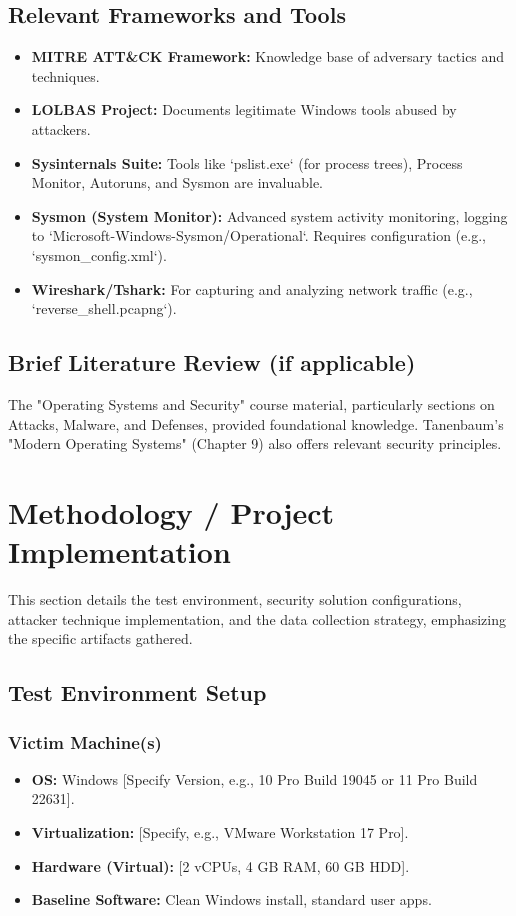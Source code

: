\documentclass[11pt]{article}
\begin{document}
	\subsection{Relevant Frameworks and Tools}
	\begin{itemize}
		\item \textbf{MITRE ATT\&CK Framework:} Knowledge base of adversary tactics and techniques.
		\item \textbf{LOLBAS Project:} Documents legitimate Windows tools abused by attackers.
		\item \textbf{Sysinternals Suite:} Tools like `pslist.exe` (for process trees), Process Monitor, Autoruns, and Sysmon are invaluable.
		\item \textbf{Sysmon (System Monitor):} Advanced system activity monitoring, logging to `Microsoft-Windows-Sysmon/Operational`. Requires configuration (e.g., `sysmon_config.xml`).
		\item \textbf{Wireshark/Tshark:} For capturing and analyzing network traffic (e.g., `reverse_shell.pcapng`).
	\end{itemize}
	\subsection{Brief Literature Review (if applicable)}
	The "Operating Systems and Security" course material, particularly sections on Attacks, Malware, and Defenses, provided foundational knowledge. Tanenbaum's "Modern Operating Systems" (Chapter 9) also offers relevant security principles.
	\newpage
	
	\section{Methodology / Project Implementation}
	This section details the test environment, security solution configurations, attacker technique implementation, and the data collection strategy, emphasizing the specific artifacts gathered.
	
	\subsection{Test Environment Setup}
	\subsubsection{Victim Machine(s)}
	\begin{itemize}
		\item \textbf{OS:} Windows [Specify Version, e.g., 10 Pro Build 19045 or 11 Pro Build 22631].
		\item \textbf{Virtualization:} [Specify, e.g., VMware Workstation 17 Pro].
		\item \textbf{Hardware (Virtual):} [2 vCPUs, 4 GB RAM, 60 GB HDD].
		\item \textbf{Baseline Software:} Clean Windows install, standard user apps.
	\end{itemize}
\end{document}
